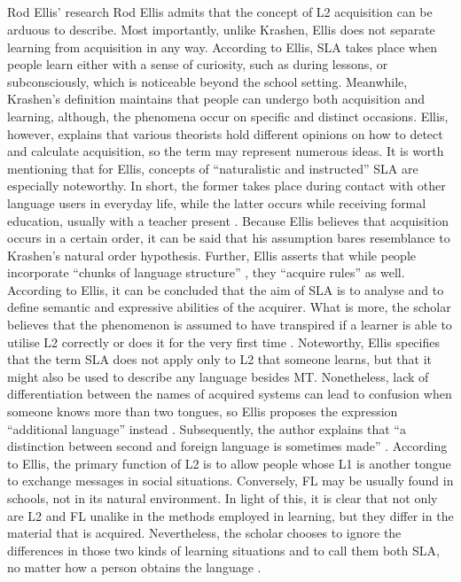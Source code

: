 \documentclass{article}
\begin{document}
\subsection{}
 Rod Ellis’ research
 Rod Ellis admits that the concept of L2 acquisition can be arduous to describe. Most importantly, unlike Krashen, Ellis does not separate learning from acquisition in any way. According to Ellis, SLA takes place when people learn either with a sense of curiosity, such as during lessons, or subconsciously, which is noticeable beyond the school setting. Meanwhile, Krashen’s definition maintains that people can undergo both acquisition and learning, although, the phenomena occur on specific and distinct occasions. Ellis, however, explains that various theorists hold different opinions on how to detect and calculate acquisition, so the term may represent numerous ideas. It is worth mentioning that for Ellis, concepts of “naturalistic and instructed” \cite{ellis_study_1994} SLA are especially noteworthy. In short, the former takes place during contact with other language users in everyday life, while the latter occurs while receiving formal education, usually with a teacher present \cite{ellis_study_1994}.
Because Ellis believes that acquisition occurs in a certain order, it can be said that his assumption bares resemblance to Krashen’s natural order hypothesis. Further, Ellis asserts that while people incorporate “chunks of language structure” \cite{ellis_study_1994}, they “acquire rules” \cite{ellis_study_1994} as well. According to Ellis, it can be concluded that the aim of SLA is to analyse and to define semantic and expressive abilities of the acquirer. What is more, the scholar believes that the phenomenon is assumed to have transpired if a learner is able to utilise L2 correctly or does it for the very first time \cite{ellis_study_1994}.
Noteworthy, Ellis specifies that the term SLA does not apply only to L2 that someone learns, but that it might also be used to describe any language besides MT. Nonetheless, lack of differentiation between the names of acquired systems can lead to confusion when someone knows more than two tongues, so Ellis proposes the expression “additional language” instead \cite{ellis_study_1994}. Subsequently, the author explains that “a distinction between second and foreign language is sometimes made” \cite{ellis_study_1994}. According to Ellis, the primary function of L2 is to allow people whose L1 is another tongue to exchange messages in social situations. Conversely, FL may be usually found in schools, not in its natural environment. In light of this, it is clear that not only are L2 and FL unalike in the methods employed in learning, but they differ in the material that is acquired. Nevertheless, the scholar chooses to ignore the differences in those two kinds of learning situations and to call them both SLA, no matter how a person obtains the language \cite{ellis_study_1994}.
\end{document}
